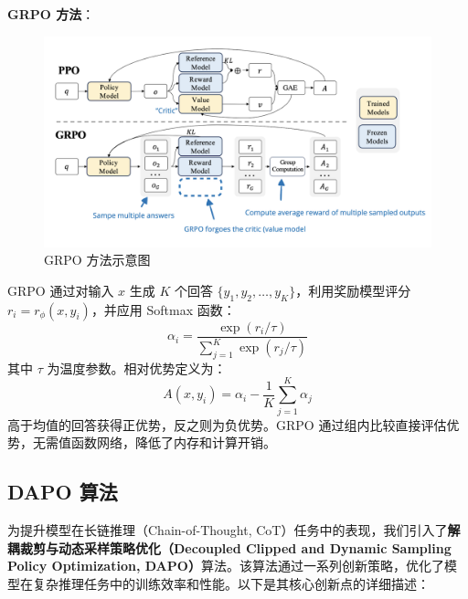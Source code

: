 \documentclass{pkuthesis}
\begin{document}
\textbf{GRPO 方法}：  
\begin{figure}[h]
    \centering
    \includegraphics[width=1\textwidth]{figures/grpo.png}
    \caption{GRPO 方法示意图\cite{shao2024deepseekmath}}
    \label{fig:grpo}
\end{figure}
GRPO 通过对输入 \( x \) 生成 \( K \) 个回答 \( \{y_1, y_2, \dots, y_K\} \)，利用奖励模型评分 \( r_i = r_{\phi}(x, y_i) \)，并应用 Softmax 函数：
\[
\alpha_i = \frac{\exp(r_i / \tau)}{\sum_{j=1}^K \exp(r_j / \tau)}
\]
其中 \( \tau \) 为温度参数。相对优势定义为：
\[
A(x, y_i) = \alpha_i - \frac{1}{K} \sum_{j=1}^K \alpha_j
\]
高于均值的回答获得正优势，反之则为负优势。GRPO 通过组内比较直接评估优势，无需值函数网络，降低了内存和计算开销。


\subsection{DAPO 算法}
为提升模型在长链推理（Chain-of-Thought, CoT）任务中的表现，我们引入了\textbf{解耦裁剪与动态采样策略优化（Decoupled Clipped and Dynamic Sampling Policy Optimization, DAPO）}算法。该算法通过一系列创新策略，优化了模型在复杂推理任务中的训练效率和性能。以下是其核心创新点的详细描述：
\end{document}
